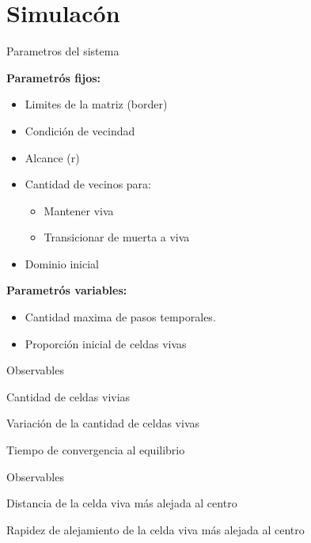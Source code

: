 \section{Simulacón}
\begin{frame}{Parametros del sistema}
    \begin{minipage}[t]{0.45\linewidth}

        {\textbf{Parametrós fijos:}
        \begin{itemize}
            \item Limites de la matriz (border)
            \item Condición de vecindad
            \item Alcance (r)
            \item Cantidad de vecinos para:
            \begin{itemize}
                \item Mantener viva
                \item Transicionar de muerta a viva
            \end{itemize}
            \item Dominio inicial
        \end{itemize}}
    \end{minipage}
    \begin{minipage}[t]{0.45\linewidth}
        \textbf{Parametrós variables:}
        \begin{itemize}
            \item Cantidad maxima de pasos temporales.
            \item Proporción inicial de celdas vivas
        \end{itemize}

    \end{minipage}
\end{frame}

\begin{frame}{Observables}

    \begin{block}{Cantidad de celdas vivias}

    \end{block}

    \begin{block}{Variación de la cantidad de celdas vivas}

    \end{block}

    \begin{block}{Tiempo de convergencia al equilibrio}

    \end{block}


\end{frame}

\begin{frame}{Observables}

    \begin{block}{Distancia de la celda viva más alejada al centro}

    \end{block}

    \begin{block}{Rapidez de alejamiento de la celda viva más alejada al centro}

    \end{block}


\end{frame}
